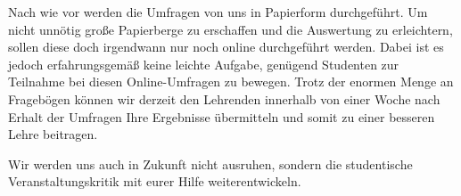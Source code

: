 \begin{multicols}{2}
Nach wie vor werden die Umfragen von uns in Papierform durchgeführt.
Um nicht unnötig große Papierberge zu erschaffen und die Auswertung zu erleichtern, sollen diese doch irgendwann nur noch online durchgeführt werden.
Dabei ist es jedoch erfahrungsgemäß keine leichte Aufgabe, genügend Studenten zur Teilnahme bei diesen Online-Umfragen zu bewegen.
Trotz der enormen Menge an Fragebögen können wir derzeit den Lehrenden innerhalb von einer Woche nach Erhalt der Umfragen Ihre Ergebnisse übermitteln und somit zu einer besseren Lehre beitragen.

Wir werden uns auch in Zukunft nicht ausruhen, sondern die studentische Veranstaltungskritik mit eurer Hilfe weiterentwickeln.

\end{multicols}

